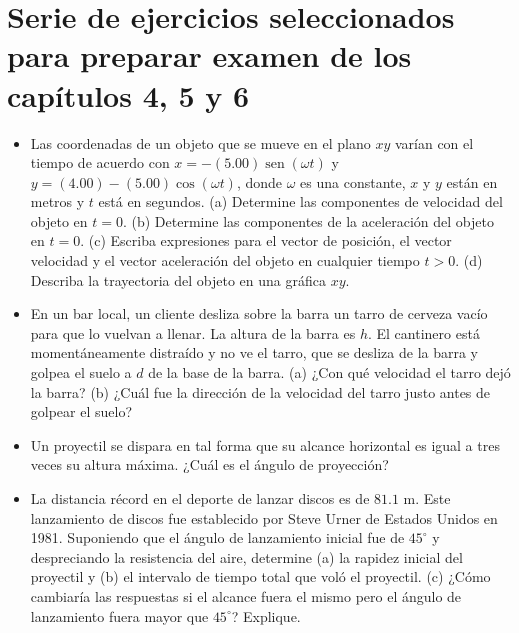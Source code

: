 \documentclass[11pt,a4paper]{article}
\begin{document}
\section*{Serie de ejercicios seleccionados para preparar examen de los capítulos 4, 5 y 6}

\begin{itemize}
    \item[\textbf{1.}] Las coordenadas de un objeto que se mueve en el plano $xy$ varían con el tiempo de acuerdo con $x = -(5.00) \operatorname{sen}(\omega t)$ y $y = (4.00) - (5.00) \cos(\omega t)$, donde $\omega$ es una constante, $x$ y $y$ están en metros y $t$ está en segundos. (a) Determine las componentes de velocidad del objeto en $t = 0$. (b) Determine las componentes de la aceleración del objeto en $t = 0$. (c) Escriba expresiones para el vector de posición, el vector velocidad y el vector aceleración del objeto en cualquier tiempo $t > 0$. (d) Describa la trayectoria del objeto en una gráfica $xy$.
    \vspace*{7cm}

    \item[\textbf{2.}] En un bar local, un cliente desliza sobre la barra un tarro de cerveza vacío para que lo vuelvan a llenar. La altura de la barra es $h$. El cantinero está momentáneamente distraído y no ve el tarro, que se desliza de la barra y golpea el suelo a $d$ de la base de la barra. (a) ¿Con qué velocidad el tarro dejó la barra? (b) ¿Cuál fue la dirección de la velocidad del tarro justo antes de golpear el suelo?
    \vspace*{6cm}

    \item[\textbf{3.}] Un proyectil se dispara en tal forma que su alcance horizontal es igual a tres veces su altura máxima. ¿Cuál es el ángulo de proyección?
    \vspace*{6cm}

    \item[\textbf{4.}] La distancia récord en el deporte de lanzar discos es de $81.1 \text{ m}$. Este lanzamiento de discos fue establecido por Steve Urner de Estados Unidos en 1981. Suponiendo que el ángulo de lanzamiento inicial fue de $45^\circ$ y despreciando la resistencia del aire, determine (a) la rapidez inicial del proyectil y (b) el intervalo de tiempo total que voló el proyectil. (c) ¿Cómo cambiaría las respuestas si el alcance fuera el mismo pero el ángulo de lanzamiento fuera mayor que $45^\circ$? Explique.
    \vspace*{6cm}
\end{itemize}
\end{document}
